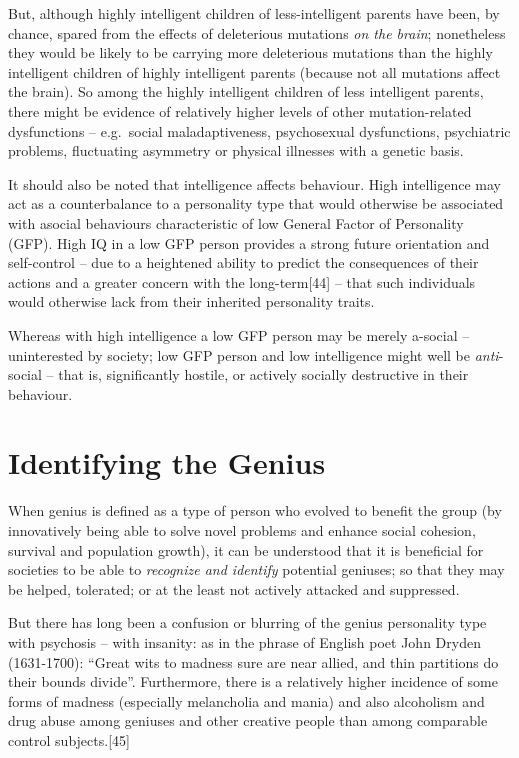 \documentclass[
]{book}
\begin{document}
But, although highly intelligent children of less-intelligent parents have been, by chance, spared from the effects of deleterious mutations \emph{on the brain}; nonetheless they would be likely to be carrying more deleterious mutations than the highly intelligent children of highly intelligent parents (because not all mutations affect the brain). So among the highly intelligent children of less intelligent parents, there might be evidence of relatively higher levels of other mutation-related dysfunctions -- e.g.~social maladaptiveness, psychosexual dysfunctions, psychiatric problems, fluctuating asymmetry or physical illnesses with a genetic basis.

It should also be noted that intelligence affects behaviour. High intelligence may act as a counterbalance to a personality type that would otherwise be associated with asocial behaviours characteristic of low General Factor of Personality (GFP). High IQ in a low GFP person provides a strong future orientation and self-control -- due to a heightened ability to predict the consequences of their actions and a greater concern with the long-term{[}44{]} -- that such individuals would otherwise lack from their inherited personality traits.

Whereas with high intelligence a low GFP person may be merely a-social --uninterested by society; low GFP person and low intelligence might well be \emph{anti}-social -- that is, significantly hostile, or actively socially destructive in their behaviour.

\hypertarget{identifying-the-genius}{%
\chapter{Identifying the Genius}\label{identifying-the-genius}}

When genius is defined as a type of person who evolved to benefit the group (by innovatively being able to solve novel problems and enhance social cohesion, survival and population growth), it can be understood that it is beneficial for societies to be able to \emph{recognize and identify} potential geniuses; so that they may be helped, tolerated; or at the least not actively attacked and suppressed.

But there has long been a confusion or blurring of the genius personality type with psychosis -- with insanity: as in the phrase of English poet John Dryden (1631-1700): ``Great wits to madness sure are near allied, and thin partitions do their bounds divide''. Furthermore, there is a relatively higher incidence of some forms of madness (especially melancholia and mania) and also alcoholism and drug abuse among geniuses and other creative people than among comparable control subjects.{[}45{]}
\end{document}
